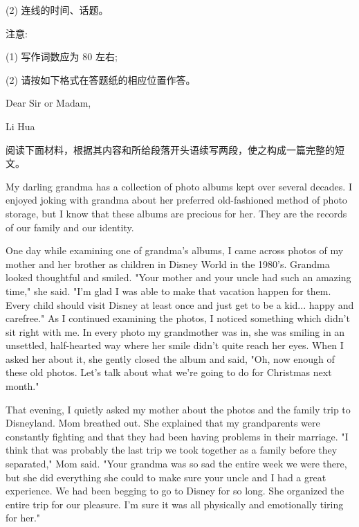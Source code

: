 \documentclass{英语试卷}
\begin{document}
\par (2) 连线的时间、话题。\par
\par 注意:\par
\par (1) 写作词数应为 80 左右;\par
\par (2) 请按如下格式在答题纸的相应位置作答。\par
\par Dear Sir or Madam,\par
\par Li Hua\par
{}
\par 阅读下面材料，根据其内容和所给段落开头语续写两段，使之构成一篇完整的短文。\par
\par My darling grandma has a collection of photo albums kept over several decades. I enjoyed joking with grandma about her preferred old-fashioned method of photo storage, but I know that these albums are precious for her. They are the records of our family and our identity.\par
\par One day while examining one of grandma's albums, I came across photos of my mother and her brother as children in Disney World in the 1980's. Grandma looked thoughtful and smiled. "Your mother and your uncle had such an amazing time," she said. "I'm glad I was able to make that vacation happen for them. Every child should visit Disney at least once and just get to be a kid... happy and carefree." As I continued examining the photos, I noticed something which didn't sit right with me. In every photo my grandmother was in, she was smiling in an unsettled, half-hearted way where her smile didn't quite reach her eyes. When I asked her about it, she gently closed the album and said, "Oh, now enough of these old photos. Let's talk about what we're going to do for Christmas next month."\par
\par That evening, I quietly asked my mother about the photos and the family trip to Disneyland. Mom breathed out. She explained that my grandparents were constantly fighting and that they had been having problems in their marriage. "I think that was probably the last trip we took together as a family before they separated," Mom said. "Your grandma was so sad the entire week we were there, but she did everything she could to make sure your uncle and I had a great experience. We had been begging to go to Disney for so long. She organized the entire trip for our pleasure. I'm sure it was all physically and emotionally tiring for her."\par
\end{document}
